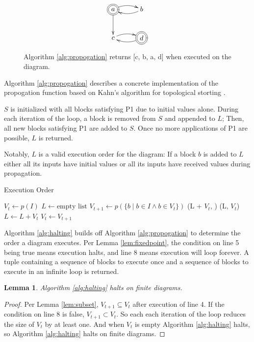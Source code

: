 \documentclass[twocolumn]{article}
\newtheorem{lemma}{Lemma}
\begin{document}
\begin{figure}[H]
\[
\xymatrix{
    *++[o][F=]{a} \ar[d] \ar@/^/[r] \ar@/_/@{<-}[r] & b \\
    c \ar@/^/[r] \ar@/_/@{<-}[r] & *++[o][F=]{d}
}
\]
    \caption{Algorithm \ref{alg:propogation} returns [c, b, a, d] when executed on the diagram.}
    \label{fig:alg1example}
\end{figure}

Algorithm \ref{alg:propogation} describes a concrete implementation of the propogation function based on Kahn's algorithm for topological storting \cite{Kahn}.

$S$ is initialized with all blocks satisfying P1 due to initial values alone. During each iteration of the loop, a block is removed from $S$ and appended to $L$; Then, all new blocks satisfying P1 are added to $S$. Once no more applications of P1 are possible, $L$ is returned.

Notably, $L$ is a valid execution order for the diagram: If a block $b$ is added to $L$ either all its inputs have initial values or all its inputs have received values during propagation.

\begin{algorithm}[h]
\caption{Execution Order}
\label{alg:halting}
\begin{algorithmic}[1]
\State \( V_t \gets p(I) \)
\State \( L \gets \text{empty list} \)
\Loop
    \State \( V_{t+1} \gets p(\{b \mid b \in I \land b \in V_t\}) \)
        \State \Return (L + \(V_t\), )
    \EndIf
        \State \Return (L, \(V_t\))
    \EndIf
    \State \(L \gets L + V_t\)
    \State \( V_t \gets V_{t+1} \)
\EndLoop
\end{algorithmic}
\end{algorithm}

Algorithm \ref{alg:halting} builds off Algorithm \ref{alg:propogation} to determine the order a diagram executes. Per Lemma \ref{lem:fixedpoint}, the condition on line 5 being true means execution halts, and line 8 means execution will loop forever. A tuple containing a sequence of blocks to execute once and a sequence of blocks to execute in an infinite loop is returned.

\begin{lemma}
    Algorithm \ref{alg:halting} halts on finite diagrams.
\end{lemma}
\begin{proof}
    Per Lemma \ref{lem:subset}, $V_{t+1}\subseteq V_t$ after execution of line 4. If the condition on line 8 is false, $V_{t+1}\subset V_t$. So each each iteration of the loop reduces the size of $V_t$ by at least one. And when $V_t$ is empty Algorithm \ref{alg:halting} halts, so Algorithm \ref{alg:halting} halts on finite diagrams.
\end{proof}
\end{document}
